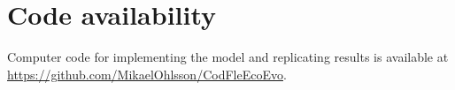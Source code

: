 \documentclass[12pt]{article}
\begin{document}





\section*{Code availability}
Computer code for implementing the model and replicating results is available at \url{https://github.com/MikaelOhlsson/CodFleEcoEvo}.
\end{document}
